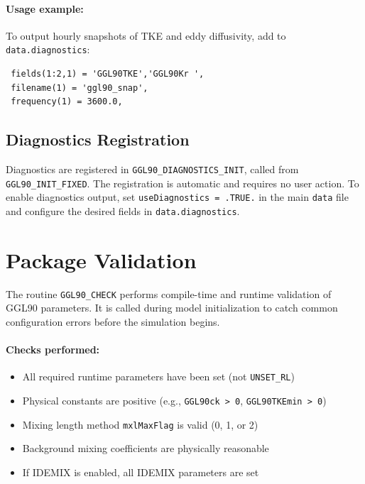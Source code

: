 \documentclass[12pt,letterpaper]{article}
\begin{document}
\paragraph{Usage example:} To output hourly snapshots of TKE and eddy diffusivity, add to \verb|data.diagnostics|:

\begin{verbatim}
 fields(1:2,1) = 'GGL90TKE','GGL90Kr ',
 filename(1) = 'ggl90_snap',
 frequency(1) = 3600.0,
\end{verbatim}

\subsection{Diagnostics Registration}
\label{sec:diag_registration}

Diagnostics are registered in \verb|GGL90_DIAGNOSTICS_INIT|, called from \verb|GGL90_INIT_FIXED|. The registration is automatic and requires no user action. To enable diagnostics output, set \verb|useDiagnostics = .TRUE.| in the main \verb|data| file and configure the desired fields in \verb|data.diagnostics|.

\section{Package Validation}
\label{sec:validation}

The routine \verb|GGL90_CHECK| performs compile-time and runtime validation of GGL90 parameters. It is called during model initialization to catch common configuration errors before the simulation begins.

\paragraph{Checks performed:}
\begin{itemize}
\item All required runtime parameters have been set (not \verb|UNSET_RL|)
\item Physical constants are positive (e.g., \verb|GGL90ck > 0|, \verb|GGL90TKEmin > 0|)
\item Mixing length method \verb|mxlMaxFlag| is valid (0, 1, or 2)
\item Background mixing coefficients are physically reasonable
\item If IDEMIX is enabled, all IDEMIX parameters are set
\end{itemize}
\end{document}

